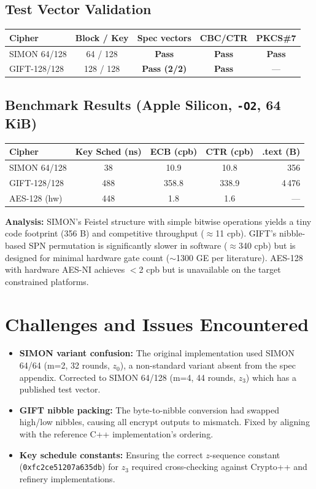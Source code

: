 \documentclass[10pt]{article}
\begin{document}
\subsection*{Test Vector Validation}
\begin{table}[h]
\centering\small
\begin{tabular}{lcccc}
\toprule
\textbf{Cipher} & \textbf{Block / Key} & \textbf{Spec vectors} & \textbf{CBC/CTR} & \textbf{PKCS\#7} \\
\midrule
SIMON 64/128 & 64 / 128 & \textbf{Pass} & \textbf{Pass} & \textbf{Pass} \\
GIFT-128/128 & 128 / 128 & \textbf{Pass (2/2)} & \textbf{Pass} & --- \\
\bottomrule
\end{tabular}
\end{table}

\subsection*{Benchmark Results (Apple Silicon, \texttt{-O2}, 64 KiB)}
\begin{table}[h]
\centering\small
\begin{tabular}{lcccr}
\toprule
\textbf{Cipher} & \textbf{Key Sched (ns)} & \textbf{ECB (cpb)} & \textbf{CTR (cpb)} & \textbf{.text (B)} \\
\midrule
SIMON 64/128 & 38 & 10.9 & 10.8 & 356 \\
GIFT-128/128 & 488 & 358.8 & 338.9 & 4\,476 \\
AES-128 (hw) & 448 & 1.8 & 1.6 & --- \\
\bottomrule
\end{tabular}
\end{table}
\textbf{Analysis:} SIMON's Feistel structure with simple bitwise operations yields a tiny code footprint (356 B) and competitive throughput ($\approx$11 cpb). GIFT's nibble-based SPN permutation is significantly slower in software ($\approx$340 cpb) but is designed for minimal hardware gate count ($\sim$1300 GE per literature). AES-128 with hardware AES-NI achieves $<$2 cpb but is unavailable on the target constrained platforms.

\section{Challenges and Issues Encountered}
\begin{itemize}
  \item \textbf{SIMON variant confusion:} The original implementation used SIMON 64/64 (m=2, 32 rounds, $z_0$), a non-standard variant absent from the spec appendix. Corrected to SIMON 64/128 (m=4, 44 rounds, $z_3$) which has a published test vector.
  \item \textbf{GIFT nibble packing:} The byte-to-nibble conversion had swapped high/low nibbles, causing all encrypt outputs to mismatch. Fixed by aligning with the reference C++ implementation's ordering.
  \item \textbf{Key schedule constants:} Ensuring the correct $z$-sequence constant (\texttt{0xfc2ce51207a635db}) for $z_3$ required cross-checking against Crypto++ and refinery implementations.
\end{itemize}
\end{document}
